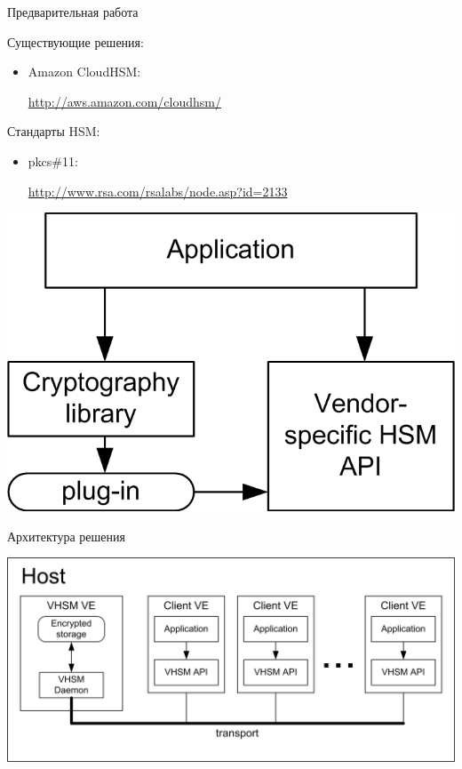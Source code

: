 \documentclass[utf8, 11pt]{beamer}
\begin{document}
\begin{frame}{Предварительная работа}

Существующие решения:
\begin{itemize}
\item Amazon CloudHSM:

\url{http://aws.amazon.com/cloudhsm/}
\end{itemize}

\vspace*{\fill}

Стандарты HSM:
\begin{itemize}
\item pkcs\#11:

\url{http://www.rsa.com/rsalabs/node.asp?id=2133}
\end{itemize}

\vspace*{\fill}

\begin{center}
\includegraphics[scale=0.75]{img1-2}
\end{center}

\end{frame}

\begin{frame}{Архитектура решения}
\begin{center}
\includegraphics[width=0.95\paperwidth]{img2}
\end{center}
\end{frame}
\end{document}
